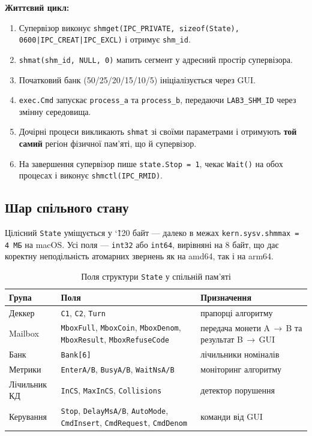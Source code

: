\documentclass[a4paper,12pt]{article}
\newcommand{\dstutablerules}{%
  \setlength{\tabcolsep}{5pt}%
  \renewcommand{\arraystretch}{1.2}%
}
\begin{document}
\textbf{Життєвий цикл:}
\begin{enumerate}
    \item Супервізор виконує
    \texttt{shmget(IPC\_PRIVATE, sizeof(State), 0600|IPC\_CREAT|IPC\_EXCL)}
    і отримує \texttt{shm\_id}.
    \item \texttt{shmat(shm\_id, NULL, 0)} мапить сегмент у адресний
    простір супервізора.
    \item Початковий банк (50/25/20/15/10/5) ініціалізується через GUI.
    \item \texttt{exec.Cmd} запускає \texttt{process\_a} та
    \texttt{process\_b}, передаючи \texttt{LAB3\_SHM\_ID} через змінну
    середовища.
    \item Дочірні процеси викликають \texttt{shmat} зі своїми
    параметрами і отримують \textbf{той самий} регіон фізичної пам'яті,
    що й супервізор.
    \item На завершення супервізор пише \texttt{state.Stop = 1}, чекає
    \texttt{Wait()} на обох процесах і виконує \texttt{shmctl(IPC\_RMID)}.
\end{enumerate}

\subsection{Шар спільного стану}

Цілісний \texttt{State} уміщується у \char`\~120 байт --- далеко в межах
\texttt{kern.sysv.shmmax = 4\,МБ} на macOS. Усі поля ---
\texttt{int32} або \texttt{int64}, вирівняні на 8 байт, що дає коректну
неподільність атомарних звернень як на amd64, так і на arm64.

\begin{table}[H]
\caption{Поля структури \texttt{State} у спільній пам'яті}
\dstutablerules
\begin{tabularx}{\linewidth}{@{}l L L@{}}
\toprule
Група & Поля & Призначення \\
\midrule
Деккер          & \texttt{C1}, \texttt{C2}, \texttt{Turn}                                        & прапорці алгоритму \\
Mailbox         & \texttt{MboxFull}, \texttt{MboxCoin}, \texttt{MboxDenom}, \texttt{MboxResult}, \texttt{MboxRefuseCode} & передача монети A\,$\to$\,B та результат B\,$\to$\,GUI \\
Банк            & \texttt{Bank[6]}                                                               & лічильники номіналів \\
Метрики         & \texttt{EnterA/B}, \texttt{BusyA/B}, \texttt{WaitNsA/B}                        & моніторинг алгоритму \\
Лічильник КД    & \texttt{InCS}, \texttt{MaxInCS}, \texttt{Collisions}                           & детектор порушення \\
Керування       & \texttt{Stop}, \texttt{DelayMsA/B}, \texttt{AutoMode}, \texttt{CmdInsert}, \texttt{CmdRequest}, \texttt{CmdDenom} & команди від GUI \\
\bottomrule
\end{tabularx}
\end{table}
\end{document}
